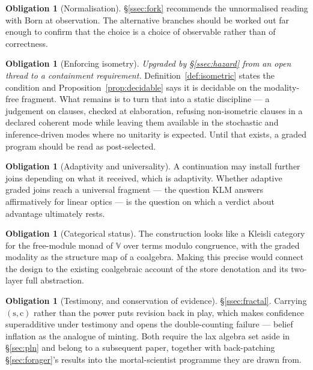\documentclass[11pt,a4paper]{article}
\theoremstyle{plain}
\theoremstyle{definition}
\newtheorem{obligation}[theorem]{Obligation}
\theoremstyle{remark}
\newcommand{\V}{\mathbb{V}}
\newcommand{\str}{\mathrm{s}}
\newcommand{\conf}{\mathrm{c}}
\begin{document}
\begin{obligation}[Normalisation]\label{ob:norm}
\S\ref{ssec:fork} recommends the unnormalised reading with Born at observation.
The alternative branches should be worked out far enough to confirm that the
choice is a choice of observable rather than of correctness.
\end{obligation}

\begin{obligation}[Enforcing isometry]\label{ob:unitary}
\emph{Upgraded by \S\ref{ssec:hazard} from an open thread to a containment
requirement.} Definition~\ref{def:isometric} states the condition and
Proposition~\ref{prop:decidable} says it is decidable on the modality-free
fragment. What remains is to turn that into a static discipline --- a judgement
on clauses, checked at elaboration, refusing non-isometric clauses in a
declared coherent mode while leaving them available in the stochastic and
inference-driven modes where no unitarity is expected. Until that exists, a
graded program should be read as post-selected.
\end{obligation}

\begin{obligation}[Adaptivity and universality]\label{ob:klm}
A continuation may install further joins depending on what it received, which is
adaptivity. Whether adaptive graded joins reach a universal fragment --- the
question KLM answers affirmatively for linear optics --- is the question on which
a verdict about advantage ultimately rests.
\end{obligation}

\begin{obligation}[Categorical status]\label{ob:cat}
The construction looks like a Kleisli category for the free-module monad of $\V$
over terms modulo congruence, with the graded modality as the structure map of a
coalgebra. Making this precise would connect the design to the existing
coalgebraic account of the store denotation and its two-layer full abstraction.
\end{obligation}

\begin{obligation}[Testimony, and conservation of evidence]\label{ob:fractal}
\S\ref{ssec:fractal}. Carrying $(\str,\conf)$ rather than the power puts
revision back in play, which makes confidence superadditive under testimony and
opens the double-counting failure --- belief inflation as the analogue of
minting. Both require the lax algebra set aside in \S\ref{sec:pln} and belong to
a subsequent paper, together with back-patching \S\ref{sec:forager}'s results
into the mortal-scientist programme they are drawn from.
\end{obligation}
\end{document}
